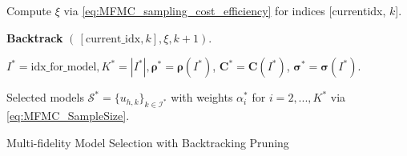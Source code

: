 \begin{algorithm}[!ht]
{{{     

        
        Compute $\xi$ via \eqref{eq:MFMC_sampling_cost_efficiency} for indices  
      [current\textunderscore idx, $k$].

      
      \textbf{Backtrack} $(\, [\text{current}\_\text{idx},k],\xi, k+1)$.
  }
}
}
\vspace{3mm} 


 
$I^* = \text{idx}\_\text{for}\_\text{model}, K^* = |I^*|, \boldsymbol{\rho}^* = \boldsymbol{\rho} (I^*)$, $\boldsymbol{C}^* = \boldsymbol{C} (I^*)$, $\boldsymbol{\sigma}^* = \boldsymbol{\sigma} (I^*)$.

Selected models $\mathcal{S}^* = \{u_{h,k}\}_{k\in \mathcal{I^*}}$ with weights $\alpha_i^*$ for $i=2,...,K^*$ via \eqref{eq:MFMC_SampleSize}.

\caption{Multi-fidelity Model Selection with Backtracking Pruning}
\end{algorithm}
\ULforem




